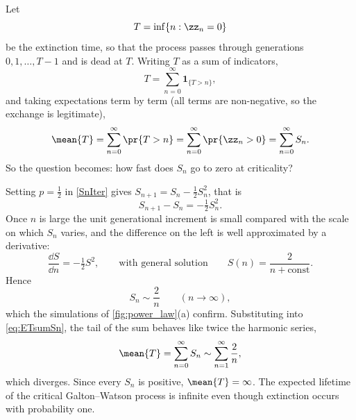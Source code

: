Let
\begin{equation*}
T = \inf\{n : \zz_n = 0\}
\end{equation*}
be the extinction time, so that the process passes through generations
$0,1,\dots,T-1$ and is dead at $T$. Writing $T$ as a sum of indicators,
\begin{equation*}
T = \sum_{n=0}^{\infty}\mathbf{1}_{\{T>n\}},
\end{equation*}
and taking expectations term by term (all terms are non-negative, so the exchange is
legitimate),
\begin{equation}
\label{eq:ETsumSn}
\mean{T} = \sum_{n=0}^{\infty}\pr{T>n} = \sum_{n=0}^{\infty}\pr{\zz_n>0} = \sum_{n=0}^{\infty}S_n .
\end{equation}
So the question becomes: how fast does $S_n$ go to zero at criticality?

Setting $p=\tfrac12$ in \cref{SnIter} gives $S_{n+1} = S_n - \tfrac12 S_n^2$, that is
\begin{equation*}
S_{n+1}-S_n = -\tfrac12 S_n^2 .
\end{equation*}
Once $n$ is large the unit generational increment is small compared with the scale
on which $S_n$ varies, and the difference on the left is well approximated by a
derivative:
\begin{equation*}
\frac{\dd S}{\dd n} = -\tfrac12 S^2,
\qquad\text{with general solution}\qquad
S(n) = \frac{2}{n + \text{const}}.
\end{equation*}
Hence
\begin{equation}
\label{twoovrn_sn}
S_n \sim \frac{2}{n}\qquad (n\to\infty),
\end{equation}
which the simulations of \cref{fig:power_law}(a) confirm. Substituting into
\cref{eq:ETsumSn}, the tail of the sum behaves like twice the harmonic series,
\begin{equation*}
\mean{T} = \sum_{n=0}^{\infty}S_n \sim \sum_{n=1}^{\infty}\frac{2}{n},
\end{equation*}
which diverges. Since every $S_n$ is positive, $\mean{T}=\infty$. The expected
lifetime of the critical Galton--Watson process is infinite even though extinction
occurs with probability one.

